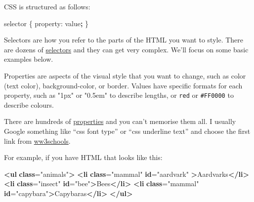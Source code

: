\documentclass[
  oneside]{book}
\newenvironment{Shaded}{\begin{snugshade}}{\end{snugshade}}
\newcommand{\ErrorTok}[1]{\textcolor[rgb]{0.64,0.00,0.00}{\textbf{#1}}}
\newcommand{\KeywordTok}[1]{\textcolor[rgb]{0.13,0.29,0.53}{\textbf{#1}}}
\newcommand{\NormalTok}[1]{#1}
\newcommand{\OperatorTok}[1]{\textcolor[rgb]{0.81,0.36,0.00}{\textbf{#1}}}
\newcommand{\OtherTok}[1]{\textcolor[rgb]{0.56,0.35,0.01}{#1}}
\newcommand{\StringTok}[1]{\textcolor[rgb]{0.31,0.60,0.02}{#1}}
\begin{document}
CSS is structured as follows:

\begin{Shaded}
\begin{Highlighting}[]
\NormalTok{selector \{ property: value}\OperatorTok{;}\NormalTok{ \}}
\end{Highlighting}
\end{Shaded}

Selectors are how you refer to the parts of the HTML you want to style. There are dozens of \href{https://www.w3schools.com/cssref/css_selectors.asp}{selectors} and they can get very complex. We'll focus on some basic examples below.

Properties are aspects of the visual style that you want to change, such as \NormalTok{color} (text color), \NormalTok{background-color}, or \NormalTok{border}. Values have specific formats for each property, such as \StringTok{"1px"} or \StringTok{"0.5em"} to describe lengths, or \texttt{red} or \texttt{\#FF0000} to describe colours.

\begin{info}
There are hundreds of \href{https://www.w3schools.com/cssref/default.asp}{properties} and you can't memorise them all. I usually Google something like ``css font type'' or ``css underline text'' and choose the first link from \href{https://www.w3schools.com}{ww3schools}.

\end{info}

For example, if you have HTML that looks like this:

\begin{Shaded}
\begin{Highlighting}[]
\KeywordTok{\textless{}ul} \ErrorTok{class}\OtherTok{=}\StringTok{"animals"}\KeywordTok{\textgreater{}}
    \KeywordTok{\textless{}li} \ErrorTok{class}\OtherTok{=}\StringTok{"mammal"} \ErrorTok{id}\OtherTok{=}\StringTok{"aardvark"} \KeywordTok{\textgreater{}}\NormalTok{Aardvarks}\KeywordTok{\textless{}/li\textgreater{}}
    \KeywordTok{\textless{}li} \ErrorTok{class}\OtherTok{=}\StringTok{"insect"} \ErrorTok{id}\OtherTok{=}\StringTok{"bee"}\KeywordTok{\textgreater{}}\NormalTok{Bees}\KeywordTok{\textless{}/li\textgreater{}}
    \KeywordTok{\textless{}li} \ErrorTok{class}\OtherTok{=}\StringTok{"mammal"} \ErrorTok{id}\OtherTok{=}\StringTok{"capybara"}\KeywordTok{\textgreater{}}\NormalTok{Capybaras}\KeywordTok{\textless{}/li\textgreater{}}
\KeywordTok{\textless{}/ul\textgreater{}}
\end{Highlighting}
\end{Shaded}
\end{document}
